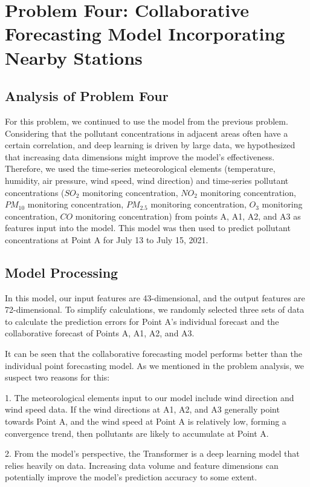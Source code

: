 \documentclass[12pt]{article}
\begin{document}
\section{Problem Four: Collaborative Forecasting Model Incorporating Nearby Stations}
\subsection{Analysis of Problem Four}
For this problem, we continued to use the model from the previous problem. Considering that the pollutant concentrations in adjacent areas often have a certain correlation, and deep learning is driven by large data, we hypothesized that increasing data dimensions might improve the model's effectiveness. Therefore, we used the time-series meteorological elements (temperature, humidity, air pressure, wind speed, wind direction) and time-series pollutant concentrations ($SO_2$ monitoring concentration, $NO_2$ monitoring concentration, $PM_{10}$ monitoring concentration, $PM_{2.5}$ monitoring concentration, $O_3$ monitoring concentration, $CO$ monitoring concentration) from points A, A1, A2, and A3 as features input into the model. This model was then used to predict pollutant concentrations at Point A for July 13 to July 15, 2021.
\subsection{Model Processing}
In this model, our input features are 43-dimensional, and the output features are 72-dimensional. To simplify calculations, we randomly selected three sets of data to calculate the prediction errors for Point A's individual forecast and the collaborative forecast of Points A, A1, A2, and A3.

It can be seen that the collaborative forecasting model performs better than the individual point forecasting model. As we mentioned in the problem analysis, we suspect two reasons for this:

1. The meteorological elements input to our model include wind direction and wind speed data. If the wind directions at A1, A2, and A3 generally point towards Point A, and the wind speed at Point A is relatively low, forming a convergence trend, then pollutants are likely to accumulate at Point A.

2. From the model's perspective, the Transformer is a deep learning model that relies heavily on data. Increasing data volume and feature dimensions can potentially improve the model's prediction accuracy to some extent.
\end{document}
